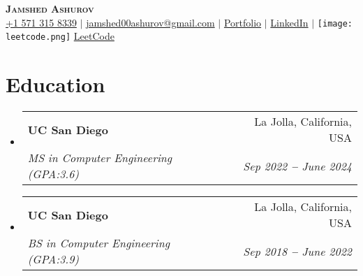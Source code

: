 \documentclass[letterpaper,11pt]{article}
\makeatletter
\newcommand{\faLeetcode}{\texttt{[image: leetcode.png]}}
\newcommand{\resumeSubheading}[4]{
  \vspace{-2pt}\item
    \begin{tabular*}{0.97\textwidth}[t]{l@{\extracolsep{\fill}}r}
      \textcolor{secondary_color}{\textbf{#1}} & \textcolor{secondary_color}{#2} \\
      \textit{\small#3} & \textit{\small #4} \\
    \end{tabular*}\vspace{-7pt}
}
\newcommand{\resumeSubHeadingListStart}{\begin{itemize}[leftmargin=0.15in, label={}]}
\newcommand{\resumeSubHeadingListEnd}{\end{itemize}}
\makeatother
\begin{document}

\begin{center}
    \textbf{\Huge \scshape \textcolor{main_color}{Jamshed Ashurov}} \\ \vspace{3pt}
    \small
    \faMobile \hspace{.5pt} \href{tel:15713158339}{+1 571 315 8339}
    $|$
    \faAt \hspace{.5pt} \href{mailto:jamshed00ashurov@gmail.com}{jamshed00ashurov@gmail.com}
    $|$
    \faGlobe \hspace{.5pt} \href{https://ashurja.github.io/}{\textcolor{secondary_color}{Portfolio}}
    $|$
    \faLinkedinSquare \hspace{.5pt} \href{https://www.linkedin.com/in/jamshed-ashurov/}{\textcolor{secondary_color}{LinkedIn}}
    $|$
    \faLeetcode \hspace{.5pt} \href{https://leetcode.com/u/jashurov/}{\textcolor{secondary_color}{LeetCode}}
\end{center}




\section{Education}
  \vspace{3pt}
  \resumeSubHeadingListStart
    \resumeSubheading
      {UC San Diego}{La Jolla, California, USA}
      {MS in Computer Engineering (GPA:3.6)}{Sep 2022 \textbf{--} June 2024}
    \resumeSubheading
      {UC San Diego}{La Jolla, California, USA}
      {BS in Computer Engineering (GPA:3.9)}{Sep 2018 \textbf{--} June 2022}

    
  \resumeSubHeadingListEnd

\end{document}
